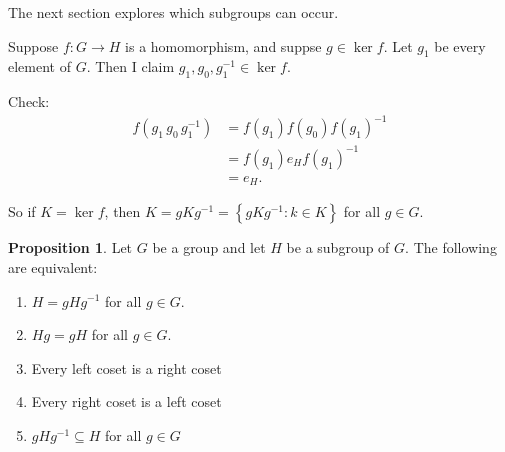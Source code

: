 \documentclass{article}
\theoremstyle{definition}
\newtheorem{proposition}[theorem]{Proposition}
\newcommand{\func}[3]{#1 : #2 \rightarrow #3}
\begin{document}
The next section explores which subgroups can occur.

Suppose $\func{f}{G}{H}$ is a homomorphism, and suppse $g \in \ker f$. Let $g_1$ be every element of $G$. Then I claim $g_1,g_0,g_1^{-1}\in \ker f$.

Check: 
\begin{align*}
  f(g_1\,g_0\,g_1^{-1}) &= f(g_1)f(g_0)f(g_1)^{-1}\\
  &= f(g_1)e_Hf(g_1)^{-1} \\
  &= e_H.
\end{align*}

So if $K=\ker f$, then $K=gKg^{-1}=\left\{ gKg^{-1} : k \in K \right\}$ for all $g \in G.$\\

\begin{proposition}
  \label{prp:tfae}
  Let $G$ be a group and let $H$ be a subgroup of $G$. The following are equivalent:
  \begin{enumerate}
    \item $H=gHg^{-1}$ for all $g \in G$.
    \item $Hg=gH$ for all $g \in G$.
    \item Every left coset is a right coset
    \item Every right coset is a left coset
    \item $gHg^{-1} \subseteq H$ for all $g \in G$
  \end{enumerate}
\end{proposition}
\end{document}
